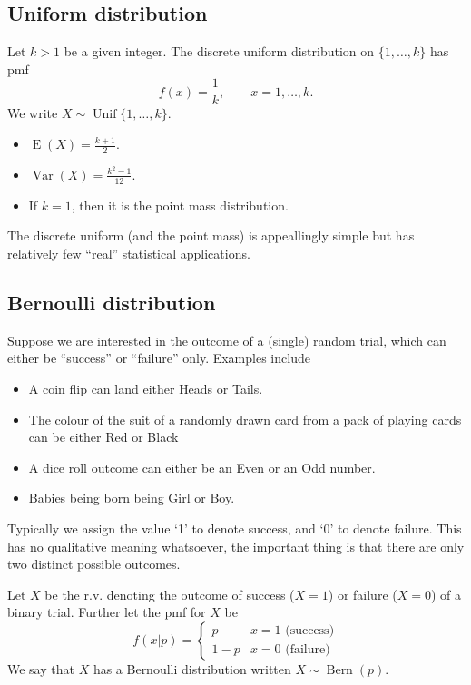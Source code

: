 \documentclass[
]{book}
\providecommand{\tightlist}{%
  \setlength{\itemsep}{0pt}\setlength{\parskip}{0pt}}
\DeclareMathOperator{\E}{E}
\DeclareMathOperator{\Var}{Var}
\DeclareMathOperator{\Bern}{Bern}
\DeclareMathOperator{\Unif}{Unif}
\theoremstyle{definition}
\theoremstyle{definition}
\theoremstyle{definition}
\theoremstyle{definition}
\theoremstyle{remark}
\begin{document}
\hypertarget{uniform-distribution}{%
\subsection{Uniform distribution}\label{uniform-distribution}}

Let \(k>1\) be a given integer. The discrete uniform distribution on \(\{1,\dots,k\}\) has pmf
\[
f(x) = \frac{1}{k}, \hspace{2em} x=1,\dots,k.
\]
We write \(X\sim\Unif\{1,\dots,k\}\).

\begin{itemize}
\tightlist
\item
  \(\E(X)=\frac{k+1}{2}\).
\item
  \(\Var(X)=\frac{k^2-1}{12}\).
\item
  If \(k=1\), then it is the point mass distribution.
\end{itemize}

The discrete uniform (and the point mass) is appeallingly simple but has relatively few ``real'' statistical applications.

\hypertarget{bernoulli-distribution}{%
\subsection{Bernoulli distribution}\label{bernoulli-distribution}}

Suppose we are interested in the outcome of a (single) random trial, which can either be {``success''} or {``failure''} only. Examples include

\begin{itemize}
\tightlist
\item
  A coin flip can land either {Heads} or {Tails}.
\item
  The colour of the suit of a randomly drawn card from a pack of playing cards can be either {Red} or {Black}
\item
  A dice roll outcome can either be an {Even} or an {Odd} number.
\item
  Babies being born being {Girl} or {Boy}.
\end{itemize}

Typically we assign the value `1' to denote success, and `0' to denote failure.
This has no qualitative meaning whatsoever, the important thing is that there are only two distinct possible outcomes.

Let \(X\) be the r.v. denoting the outcome of success (\(X=1\)) or failure (\(X=0\)) of a binary trial.
Further let the pmf for \(X\) be
\[
f(x|p) = \begin{cases}
p & x=1\text{ (success)}\\
1-p &x=0 \text{ (failure)}
\end{cases}
\]
We say that \(X\) has a Bernoulli distribution written \(X\sim\Bern(p)\).
\end{document}
